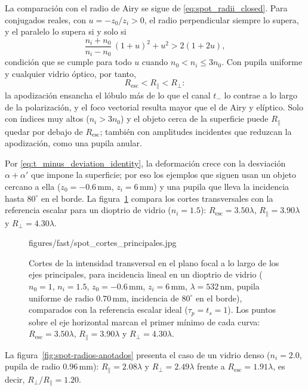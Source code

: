 La comparación con el radio de Airy se sigue de \eqref{eq:spot_radii_closed}.
Para conjugados reales, con $u=-z_0/z_i>0$, el radio perpendicular siempre
lo supera, y el paralelo lo supera si y solo si
\begin{equation}
  \frac{n_i+n_0}{n_i-n_0}\,(1+u)^2+u^2>2(1+2u),
\end{equation}
condición que se cumple para todo $u$ cuando $n_0<n_i\le 3n_0$. Con pupila
uniforme y cualquier vidrio óptico, por tanto,
\begin{equation}
  R_{\mathrm{esc}} < R_\parallel < R_\perp :
\end{equation}
la apodización ensancha el lóbulo más de lo que el canal $t_-$ lo contrae a lo
largo de la polarización, y el foco vectorial resulta mayor que el de Airy y
elíptico. Solo con índices muy altos ($n_i>3n_0$) y el objeto cerca de la
superficie puede $R_\parallel$ quedar por debajo de $R_{\mathrm{esc}}$; también
con amplitudes incidentes que reduzcan la apodización, como una pupila anular.

Por \eqref{eq:t_minus_deviation_identity}, la deformación crece con la
desviación $\alpha+\alpha'$ que impone la superficie; por eso los ejemplos que
siguen usan un objeto cercano a ella ($z_0=-0.6\,\mathrm{mm}$,
$z_i=6\,\mathrm{mm}$) y una pupila que lleva la incidencia hasta $80^\circ$ en
el borde. La figura~\ref{fig:spot-cortes-principales} compara los cortes
transversales con la referencia escalar para un dioptrio de vidrio
($n_i=1.5$): $R_{\mathrm{esc}}=3.50\lambda$, $R_\parallel=3.90\lambda$ y
$R_\perp=4.30\lambda$.

\begin{figure}[!htbp]
  \centering
    {figures/fast/spot_cortes_principales.jpg}
  \caption{Cortes de la intensidad transversal en el plano focal a lo largo
  de los ejes principales, para incidencia lineal en un dioptrio de vidrio
  ($n_0=1$, $n_i=1.5$, $z_0=-0.6\,\mathrm{mm}$, $z_i=6\,\mathrm{mm}$,
  $\lambda=532\,\mathrm{nm}$, pupila uniforme de radio $0.70\,\mathrm{mm}$,
  incidencia de $80^\circ$ en el borde), comparados con la referencia escalar
  ideal ($\tau_p=t_s=1$). Los puntos sobre el eje horizontal marcan el primer
  mínimo de cada curva: $R_{\mathrm{esc}}=3.50\lambda$,
  $R_\parallel=3.90\lambda$ y $R_\perp=4.30\lambda$.}
  \label{fig:spot-cortes-principales}
\end{figure}

La figura~\ref{fig:spot-radios-anotados} presenta el caso de un vidrio denso
($n_i=2.0$, pupila de radio $0.96\,\mathrm{mm}$): $R_\parallel=2.08\lambda$ y
$R_\perp=2.49\lambda$ frente a $R_{\mathrm{esc}}=1.91\lambda$, es decir,
$R_\perp/R_\parallel=1.20$.

